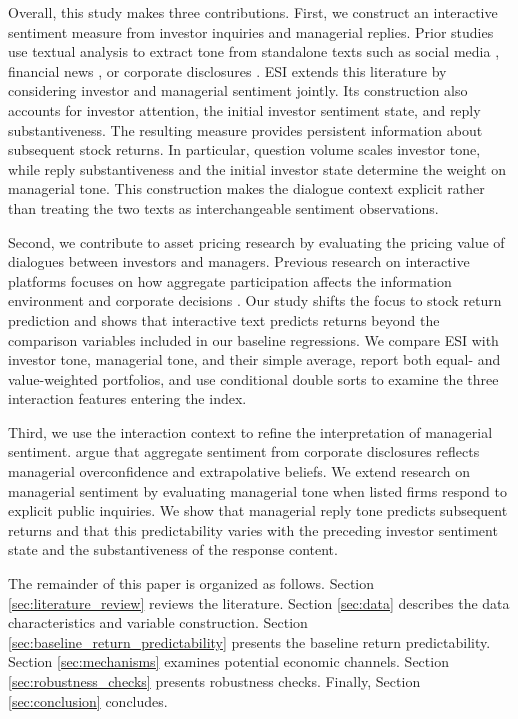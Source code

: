 \documentclass[12pt]{article}
\begin{document}
Overall, this study makes three contributions. First, we construct an interactive sentiment measure from investor inquiries and managerial replies. Prior studies use textual analysis to extract tone from standalone texts such as social media \citep{bartov2018,chen2014,cookson2024}, financial news \citep{ke2021predicting,lopez2023chatgpt}, or corporate disclosures \citep{jiang2019}. ESI extends this literature by considering investor and managerial sentiment jointly. Its construction also accounts for investor attention, the initial investor sentiment state, and reply substantiveness. The resulting measure provides persistent information about subsequent stock returns. In particular, question volume scales investor tone, while reply substantiveness and the initial investor state determine the weight on managerial tone. This construction makes the dialogue context explicit rather than treating the two texts as interchangeable sentiment observations.

Second, we contribute to asset pricing research by evaluating the pricing value of dialogues between investors and managers. Previous research on interactive platforms focuses on how aggregate participation affects the information environment and corporate decisions \citep{lee2022shall,xu2024}. Our study shifts the focus to stock return prediction and shows that interactive text predicts returns beyond the comparison variables included in our baseline regressions. We compare ESI with investor tone, managerial tone, and their simple average, report both equal- and value-weighted portfolios, and use conditional double sorts to examine the three interaction features entering the index. 

Third, we use the interaction context to refine the interpretation of managerial sentiment. \citet{jiang2019} argue that aggregate sentiment from corporate disclosures reflects managerial overconfidence and extrapolative beliefs. We extend research on managerial sentiment by evaluating managerial tone when listed firms respond to explicit public inquiries. We show that managerial reply tone predicts subsequent returns and that this predictability varies with the preceding investor sentiment state and the substantiveness of the response content.


The remainder of this paper is organized as follows. Section \ref{sec:literature_review} reviews the literature. Section \ref{sec:data} describes the data characteristics and variable construction. Section \ref{sec:baseline_return_predictability} presents the baseline return predictability. Section \ref{sec:mechanisms} examines potential economic channels. Section \ref{sec:robustness_checks} presents robustness checks. Finally, Section \ref{sec:conclusion} concludes.
\end{document}
